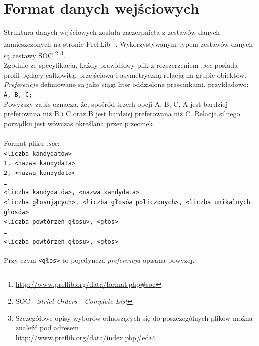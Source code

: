 \documentclass[pdflatex,11pt]{../aghdoc_version2}
\newcommand{\code}[1]{\texttt{#1}}
\begin{document}
\section{Format danych wejściowych}
\label{sec:format_danych_wejsciowych}
Struktura danych wejściowych została zaczerpnięta z zestawów danych zamieszczonych na stronie Pref\,Lib \footnote{\url{http://www.preflib.org/data/format.php\#soc}}. Wykorzystywanym typem zestawów danych są zestawy SOC \footnote{SOC - \textit{Strict Orders - Complete List}}
\footnote{Szczegółowe opisy wyborów odnoszących się do poszczególnych plików można znaleźć pod adresem\\\url{http://www.preflib.org/data/index.php\#ed}}.\\
Zgodnie ze specyfikacją, każdy prawidłowy plik z rozszerzeniem \textit{.soc} posiada profil będący całkowitą, przejściową i asymetryczną relacją na grupie obiektów.\\
\textit{Preferencje} definiowane są jako ciągi liter oddzielone przecinkami, przykładowo:\\
\code{A, B, C;}\\
Powyższy zapis oznacza, że, spośród trzech opcji A, B, C, A jest bardziej preferowana niż B i C oraz B jest bardziej preferowana niż C. Relacja silnego porządku jest wówczas określana przez przecinek.\\
\\
Format pliku \textit{.soc}:\\
\code{<liczba kandydatów> \\
1, <nazwa kandydata> \\
2, <nazwa kandydata> \\
… \\
<liczba kandydatów>, <nazwa kandydata> \\
<liczba głosujących>, <liczba głosów policzonych>, <liczba unikalnych głosów> \\
<liczba powtórzeń głosu>, <głos> \\
… \\
<liczba powtórzeń głosu>, <głos>}\\
\\
Przy czym \code{<głos>} to pojedyncza \textit{preferencja} opisana powyżej.
\end{document}
